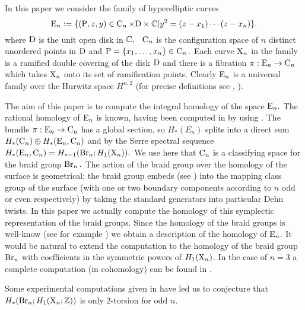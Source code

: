  In this paper we consider %
 the family of hyperelliptic curves 
$$
\mathrm{E}_{n} := \{(\mathrm{P}, z,y ) \in \operatorname{C}_n  \times \mathrm{D} \times {\mathbb{C}}| y^2 = (z-x_1)\cdots(z-x_n) \}.
$$ 
where $\mathrm{D}$ is the unit open disk in ${\mathbb{C}}, $ \  $\operatorname{C}_n$ is the configuration space of $n$ distinct unordered points in $\mathrm{D}$ and $\mathrm{P}=\{x_1,\dots,x_n\}\in \operatorname{C}_n.$  
Each curve $\mathrm{X}_n$ in the family is a ramified double covering of the disk $\mathrm{D}$ and there is a fibration  $\pi:\mathrm{E}_n\to \operatorname{C}_n$ which takes  $\mathrm{X}_n$ onto its set of ramification points. Clearly $\mathrm{E}_n$ is a universal family over the Hurwitz space $H^{n,2}$ (for precise definitions see \cite{fulton}, \cite{evw}).

The aim of this paper is to compute the integral homology of the space $\mathrm{E}_n.$ 
The rational homology of $\mathrm{E}_n$ is known, having been computed in \cite{chen} by using \cite{cms_tams}.
The bundle $\pi:\mathrm{E}_n\to \operatorname{C}_n$ has a global section, so $H_*(E_n)$ splits into a direct sum $H_*(\operatorname{C}_n)\oplus H_*(\mathrm{E}_n,\operatorname{C}_n)$ and by the Serre spectral sequence $H_*(\mathrm{E}_n,\operatorname{C}_n)=H_{*-1}(\operatorname{Br}_n;H_1(\mathrm{X}_n)).$ 
We use here that $\operatorname{C}_n$ is a classifying space for the braid group $\operatorname{Br}_n.$ The action of the braid group over the homology of the surface is geometrical: the braid group embeds (see \cite{per_van_92, waj_99}) into the mapping class group of the surface (with one or two boundary components according to $n$ odd or even respectively) by taking the standard generators into particular Dehn twists.
In this paper we actually compute the homology of this symplectic representation of the braid groups. Since the homology of the braid groups is well-know (see for example \cite{fuks, vain, cohen}) we obtain a description of the homology of $\mathrm{E}_n.$ 
It would be natural to extend the computation to the homology of the braid group $\operatorname{Br}_n$ with coefficients in the symmetric powers of  $H_1(\mathrm{X}_n)$. In the case of $n=3$ a complete computation (in cohomology) can be found in \cite{ccs}.

Some experimental computations given in \cite{msv2012} have led us to conjecture that $H_{*}(\operatorname{Br}_n; H_1(\mathrm{X}_n;\mathbb{Z}))$  is only $2$-torsion for odd $n.$ 

